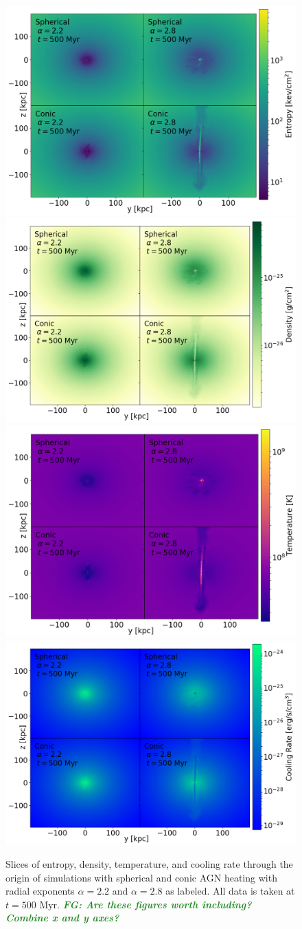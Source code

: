 \documentclass[iop,apjl, twocolappendix]{emulateapj}   %
\def\FG#1{{\textcolor{ForestGreen}{\textbf{\textit{ FG: #1}}}}}
\begin{document}
\begin{figure}
	\begin{center}
		\includegraphics[width=0.49\linewidth]{figures/entropy_slices}
		\includegraphics[width=0.49\linewidth]{figures/density_slices}
		\includegraphics[width=0.49\linewidth]{figures/temperature_slices}
		\includegraphics[width=0.49\linewidth]{figures/cooling_rate_slices}
	\end{center}
	\caption{
    \label{fig:slices}
    Slices of entropy, density, temperature, and cooling rate through the
    origin of simulations with spherical and conic AGN heating with radial
    exponents $\alpha=2.2$ and $\alpha=2.8$ as labeled. All data is taken at
    $t= 500 \text{ Myr}$. \FG{Are these figures worth including? Combine x and y axes?}}
\end{figure}
\end{document}

